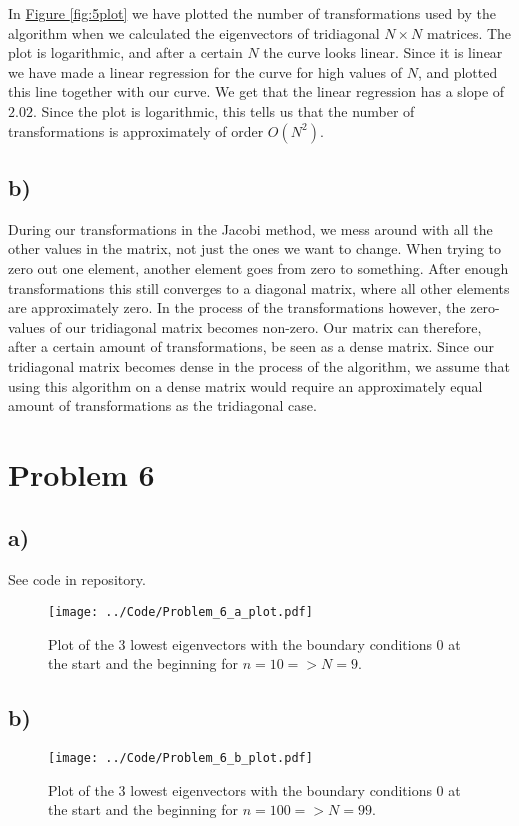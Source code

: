 \documentclass[english,notitlepage]{article}  %
\begin{document}
In \hyperref[fig:5plot]{Figure \ref*{fig:5plot}} we have plotted the number of
transformations used by the algorithm when we calculated the eigenvectors of
tridiagonal $N \times N$ matrices. The plot is logarithmic, and after a certain
$N$ the curve looks linear. Since it is linear we have made a linear regression
for the curve for high values of $N$, and plotted this line together with our
curve. We get that the linear regression has a slope of $2.02$. Since the plot
is logarithmic, this tells us that the number of transformations is
approximately of order $O(N^2)$.


\subsection*{b)}
During our transformations in the Jacobi method, we mess around with all the
other values in the matrix, not just the ones we want to change. When trying to
zero out one element, another element goes from zero to something. After enough
transformations this still converges to a diagonal matrix, where all other
elements are approximately zero. In the process of the transformations however,
the zero-values of our tridiagonal matrix becomes non-zero. Our matrix can
therefore, after a certain amount of transformations, be seen as a dense matrix.
Since our tridiagonal matrix becomes dense in the process of the algorithm, we
assume that using this algorithm on a dense matrix would require an
approximately equal amount of transformations as the tridiagonal case.

\section*{Problem 6}
\subsection*{a)}
See code in repository.

\begin{figure}[H]
    \centering
    \texttt{[image: ../Code/Problem\_6\_a\_plot.pdf]}
    \caption{Plot of the 3 lowest eigenvectors with the boundary conditions 0 at the start and the beginning for $n=10=>N=9$.}
    \label{fig:6aplot}
\end{figure}

\subsection*{b)}

\begin{figure}[H]
    \centering
    \texttt{[image: ../Code/Problem\_6\_b\_plot.pdf]}
    \caption{Plot of the 3 lowest eigenvectors with the boundary conditions 0 at the start and the beginning for $n=100=>N=99$.}
    \label{fig:6bplot}
\end{figure}
\end{document}

